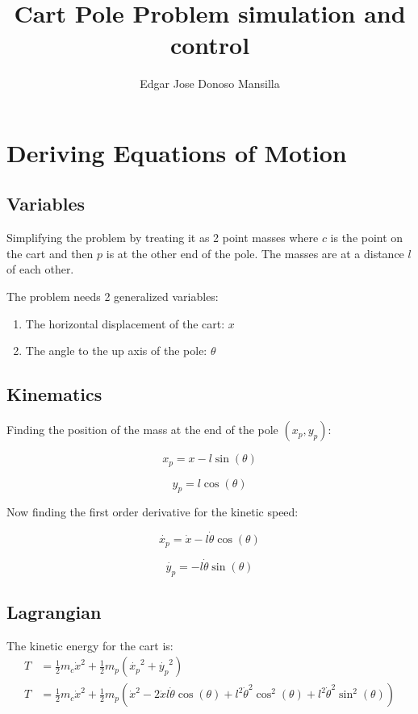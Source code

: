 \documentclass{article}
\begin{document}
\title{Cart Pole Problem simulation and control}
\author{Edgar Jose Donoso Mansilla}
\date{}
\maketitle

\section{Deriving Equations of Motion}
\subsection{Variables}
Simplifying the problem by treating it as 2 point masses where $c$ is
the point on the cart and then $p$ is at the other end of the pole.
The masses are at a distance $l$ of each other.

The problem needs 2 generalized variables:
\begin{enumerate}
	\item The horizontal displacement of the cart: $x$
	\item The angle to the up axis of the pole: $\theta$
\end{enumerate}

\subsection{Kinematics}
Finding the position of the mass at the end of the pole $(x_p, y_p)$:

\begin{equation}
	x_p = x - l \sin(\theta)
\end{equation}

\begin{equation}
	y_p = l \cos(\theta)
\end{equation}

Now finding the first order derivative for the kinetic speed:

\begin{equation}
	\dot{x_p} = \dot{x} - l \dot{\theta} \cos(\theta)
\end{equation}

\begin{equation}
	\dot{y_p} = -l \dot{\theta} \sin(\theta)
\end{equation}

\subsection{Lagrangian}
The kinetic energy for the cart is:
\begin{align*}
	T & = \frac{1}{2}m_c \dot{x}^2 + \frac{1}{2}m_p (\dot{x_p}^2 + \dot{y_p}^2) \\
	T & = \frac{1}{2}m_c \dot{x}^2
	+ \frac{1}{2}m_p (
	\dot{x}^2 - 2\dot{x}l\dot{\theta}\cos(\theta) + l^2 \dot{\theta}^2 \cos^2(\theta)
	+ l^2 \dot{\theta}^2 \sin^2 (\theta)
	)
\end{align*}
\end{document}
